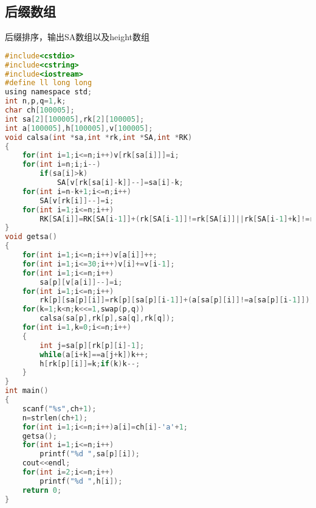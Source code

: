 \subsection{后缀数组}
后缀排序，输出SA数组以及height数组
\begin{lstlisting}[language=C] 
#include<cstdio>
#include<cstring>
#include<iostream>
#define ll long long 
using namespace std;
int n,p,q=1,k;
char ch[100005];
int sa[2][100005],rk[2][100005];
int a[100005],h[100005],v[100005];
void calsa(int *sa,int *rk,int *SA,int *RK)
{
	for(int i=1;i<=n;i++)v[rk[sa[i]]]=i;
	for(int i=n;i;i--)
		if(sa[i]>k)
			SA[v[rk[sa[i]-k]]--]=sa[i]-k;
	for(int i=n-k+1;i<=n;i++)
		SA[v[rk[i]]--]=i;
	for(int i=1;i<=n;i++)
		RK[SA[i]]=RK[SA[i-1]]+(rk[SA[i-1]]!=rk[SA[i]]||rk[SA[i-1]+k]!=rk[SA[i]+k]);
}
void getsa()
{
	for(int i=1;i<=n;i++)v[a[i]]++;
	for(int i=1;i<=30;i++)v[i]+=v[i-1];
	for(int i=1;i<=n;i++)
		sa[p][v[a[i]]--]=i;
	for(int i=1;i<=n;i++)
		rk[p][sa[p][i]]=rk[p][sa[p][i-1]]+(a[sa[p][i]]!=a[sa[p][i-1]]);
	for(k=1;k<n;k<<=1,swap(p,q))
		calsa(sa[p],rk[p],sa[q],rk[q]);
	for(int i=1,k=0;i<=n;i++)
	{
		int j=sa[p][rk[p][i]-1];
		while(a[i+k]==a[j+k])k++;
		h[rk[p][i]]=k;if(k)k--;
	}
}
int main()
{
	scanf("%s",ch+1);
	n=strlen(ch+1);
	for(int i=1;i<=n;i++)a[i]=ch[i]-'a'+1;
	getsa();
	for(int i=1;i<=n;i++)
		printf("%d ",sa[p][i]);
	cout<<endl;
	for(int i=2;i<=n;i++)
		printf("%d ",h[i]);
	return 0;
}
\end{lstlisting}